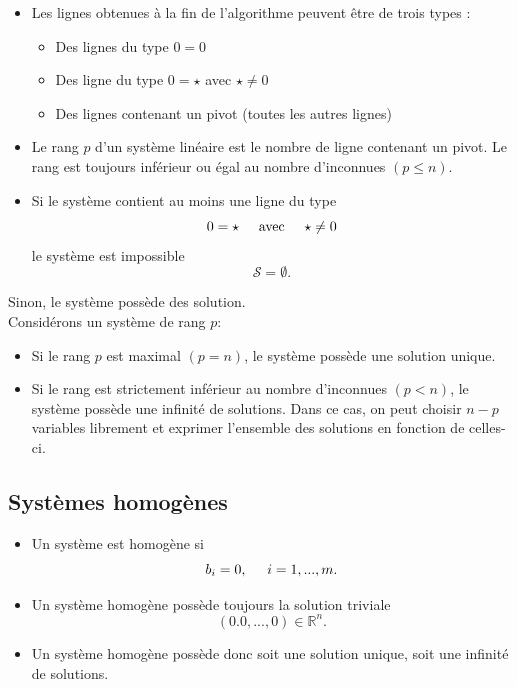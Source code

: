 \documentclass[12pt,a4paper]{article}
\begin{document}
\begin{itemize}[label=$\bullet$]
\item Les lignes obtenues à la fin de l'algorithme peuvent être de trois types :
\begin{itemize}
    \item Des lignes du type $0 = 0$
    \item Des ligne du type $0 = \star$ avec $\star \neq 0$
    \item Des lignes contenant un pivot (toutes les autres lignes)
\end{itemize}
\item Le \colorbox{def!40}{rang} $p$ d'un système linéaire est le nombre de ligne contenant un pivot. Le rang est toujours inférieur ou égal au nombre d'inconnues $(p\leq n)$.
\item Si le système contient au moins une ligne du type 
$$
0 = \star \hspace{0.5cm}\text{avec}\hspace{0.5cm} \star\neq 0
$$
le système est \textcolor{th!60!black}{impossible}
$$
\mathcal{S} = \emptyset.
$$
\end{itemize}
Sinon, le système possède des solution. 
\\
Considérons un système de rang $p$:
\begin{itemize}[label=$\bullet$]
\item Si le rang $p$ est \colorbox{def!40}{maximal} $(p=n)$, le système possède une solution \textcolor{th!60!black}{unique}.
\item Si le rang est strictement inférieur au nombre d'inconnues $(p<n)$, le système possède une \textcolor{th!60!black}{infinité} de solutions. Dans ce cas, on peut choisir $n-p$ variables librement et exprimer l'ensemble des solutions en fonction de celles-ci.
\end{itemize}

\subsection{Systèmes homogènes}
\begin{itemize}[label=$\bullet$]
    \item Un système est \colorbox{def!40}{homogène} si 
    $$
    b_i = 0, \hspace{0.5cm} i=1,...,m.
    $$
    \item Un système homogène possède toujours la solution \colorbox{def!40}{triviale}
    $$
    (0.0,...,0) \in \mathbb{R}^n.
    $$
    \item Un système homogène possède donc soit une solution \textcolor{th!60!black}{unique}, soit une \textcolor{th!60!black}{infinité} de solutions.
\end{itemize}
\end{document}
